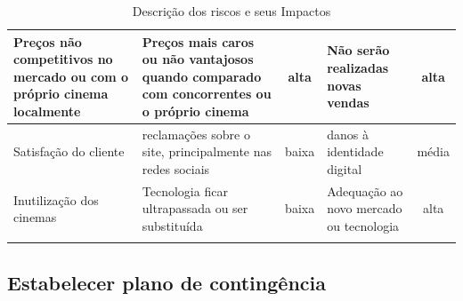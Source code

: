 \documentclass[12pt]{article}
\begin{document}
\begin{center}
\begin{longtable}{|p{2.0cm}|p{3.2cm}|c|p{3.2cm}|c|}
                Preços não competitivos no mercado ou com o próprio cinema localmente & Preços mais caros ou não vantajosos quando comparado com concorrentes ou o próprio cinema & alta & Não serão realizadas novas vendas & alta  \\ \hline 
                
                Satisfação do cliente & reclamações sobre o site, principalmente nas redes sociais & baixa & danos à identidade digital & média  \\ \hline 
                
                Inutilização dos cinemas & Tecnologia ficar ultrapassada ou ser substituída & baixa & Adequação ao novo mercado ou tecnologia & alta  \\ \hline 
              
                \caption{Descrição dos riscos e seus Impactos}
                \label{Descricao_E_Impacto_Dos_Riscos}
            \end{longtable}
        \end{center}

        
    \subsection{Estabelecer plano de contingência}
       
\end{document}
